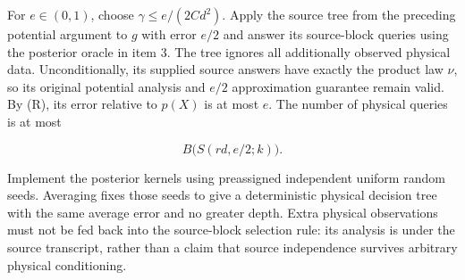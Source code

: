 For \(e\in(0,1)\), choose \(\gamma\le e/(2Cd^2)\). Apply the source tree
from the preceding potential argument to \(g\) with error \(e/2\) and
answer its source-block queries using the posterior oracle in item 3.
The tree ignores all additionally observed physical data.
Unconditionally, its supplied source answers have exactly the product
law \(\nu\), so its original potential analysis and \(e/2\)
approximation guarantee remain valid. By (R), its error relative to
\(p(X)\) is at most \(e\). The number of physical queries is at most

\[
 B\bigl(S(rd,e/2;k)\bigr).
 \tag{S3}
\]

Implement the posterior kernels using preassigned independent uniform
random seeds. Averaging fixes those seeds to give a deterministic
physical decision tree with the same average error and no greater depth.
Extra physical observations must not be fed back into the source-block
selection rule: its analysis is under the source transcript, rather than
a claim that source independence survives arbitrary physical
conditioning.
